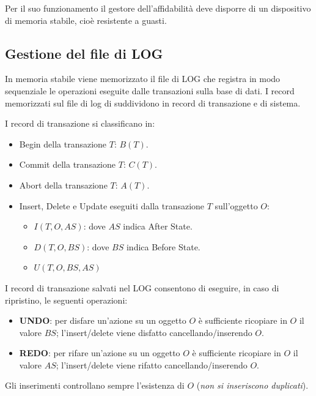 \documentclass[oneside,a4paper,11pt]{book}
\theoremstyle{italicstyle}
\theoremstyle{normStyle}
\begin{document}
Per il suo funzionamento il gestore dell'affidabilità deve disporre di un 
dispositivo di memoria stabile, cioè resistente a guasti.
\subsection{Gestione del file di LOG}
In memoria stabile viene memorizzato il file di LOG che registra in 
modo sequenziale le operazioni eseguite dalle transazioni sulla base 
di dati.
I record memorizzati sul file di log di suddividono in record di 
transazione e di sistema.

I record di transazione si classificano in:
\begin{itemize}
    \item Begin della transazione $T$: $B(T)$.
    \item Commit della transazione $T$: $C(T)$.
    \item Abort della transazione $T$: $A(T)$.
    \item Insert, Delete e Update eseguiti dalla transazione $T$ sull'oggetto $O$:
    \begin{itemize}
        \item $I(T,O,AS)$: dove $AS$ indica After State.
        \item $D(T,O,BS)$: dove $BS$ indica Before State.
        \item $U(T,O,BS,AS)$
    \end{itemize}
\end{itemize}
I record di transazione salvati nel LOG consentono di eseguire,
in caso di ripristino, le seguenti operazioni:
\begin{itemize}
    \item \textbf{UNDO}: per disfare un'azione su un oggetto $O$ è sufficiente 
    ricopiare in $O$ il valore $BS$; l'insert/delete viene disfatto 
    cancellando/inserendo $O$.
    \item \textbf{REDO}: per rifare un'azione su un oggetto $O$ è sufficiente 
    ricopiare in $O$ il valore $AS$; l'insert/delete viene rifatto 
    cancellando/inserendo $O$.
\end{itemize}
Gli inserimenti controllano sempre l'esistenza di $O$ (\textit{non si 
inseriscono duplicati}).
\end{document}
